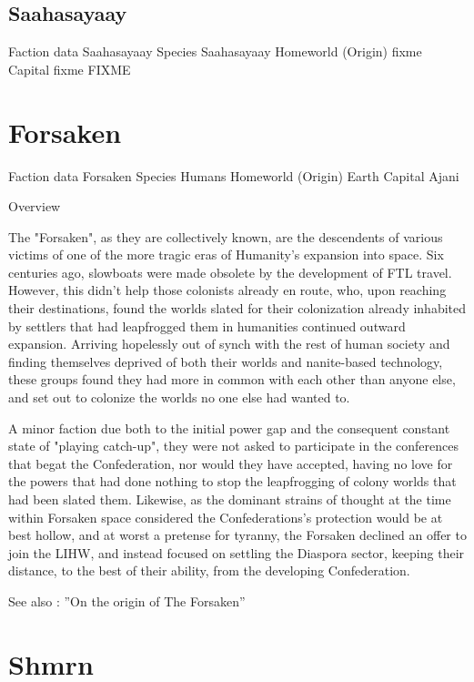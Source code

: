 \subsection{Saahasayaay}

Faction data 
Saahasayaay 
Species 	Saahasayaay 
Homeworld (Origin) 	fixme 
Capital 	fixme 
FIXME 
 
\section{Forsaken}

Faction data 
Forsaken 
Species 	Humans 
Homeworld (Origin) 	Earth 
Capital 	Ajani 


Overview 

The "Forsaken", as they are collectively known, are the
descendents of various victims of one of the more tragic eras of
Humanity's expansion into space. Six centuries ago, slowboats were
made obsolete by the development of FTL travel. However, this didn't
help those colonists already en route, who, upon reaching their
destinations, found the worlds slated for their colonization already
inhabited by settlers that had leapfrogged them in humanities
continued outward expansion. Arriving hopelessly out of synch with the
rest of human society and finding themselves deprived of both their
worlds and nanite-based technology, these groups found they had more
in common with each other than anyone else, and set out to colonize
the worlds no one else had wanted to.

A minor faction due both to the initial power gap and the consequent
constant state of "playing catch-up", they were not asked to
participate in the conferences that begat the Confederation, nor would
they have accepted, having no love for the powers that had done
nothing to stop the leapfrogging of colony worlds that had been slated
them. Likewise, as the dominant strains of thought at the time within
Forsaken space considered the Confederations's protection would be at
best hollow, and at worst a pretense for tyranny, the Forsaken
declined an offer to join the LIHW, and instead focused on settling
the Diaspora sector, keeping their distance, to the best of their
ability, from the developing Confederation.
 
See also : ''On the origin of The Forsaken'' 

\section{Shmrn}

